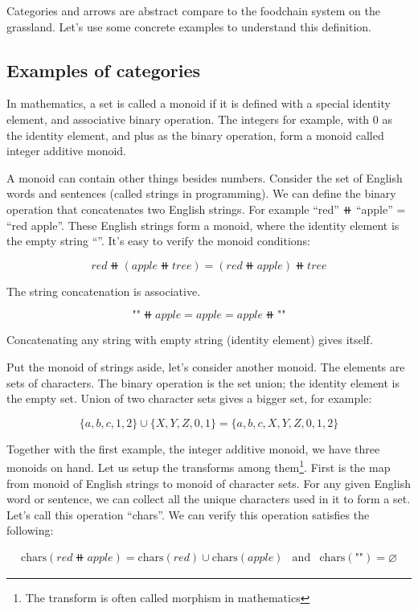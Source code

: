 \documentclass{article}
\begin{document}
Categories and arrows are abstract compare to the foodchain system on the grassland. Let's use some concrete examples to understand this definition.

\subsection{Examples of categories}

In mathematics, a set is called a monoid if it is defined with a special identity element, and associative binary operation. The integers for example, with 0 as the identity element, and plus as the binary operation, form a monoid called integer additive monoid.

A monoid can contain other things besides numbers. Consider the set of English words and sentences (called strings in programming). We can define the binary operation that concatenates two English strings. For example ``red'' $\doubleplus$ ``apple'' = ``red apple''. These English strings form a monoid, where the identity element is the empty string ``''. It's easy to verify the monoid conditions:

\[
red \doubleplus (apple \doubleplus tree) = (red \doubleplus apple) \doubleplus tree
\]

The string concatenation is associative.

\[
\texttt{""} \doubleplus apple = apple = apple \doubleplus \texttt{""}
\]

Concatenating any string with empty string (identity element) gives itself.

Put the monoid of strings aside, let's consider another monoid. The elements are sets of characters. The binary operation is the set union; the identity element is the empty set. Union of two character sets gives a bigger set, for example:

\[
\{a, b, c, 1, 2\} \cup \{X, Y, Z, 0, 1\} = \{a, b, c, X, Y, Z, 0, 1, 2\}
\]

Together with the first example, the integer additive monoid, we have three monoids on hand. Let us setup the transforms among them\footnote{The transform is often called morphism in mathematics}. First is the map from monoid of English strings to monoid of character sets. For any given English word or sentence, we can collect all the unique characters used in it to form a set. Let's call this operation ``chars''. We can verify this operation satisfies the following:

\[
\begin{array}{rcl}
\text{chars}(red \doubleplus apple) = \text{chars}(red) \cup \text{chars}(apple) & \text{and} & \text{chars}(\texttt{""}) = \varnothing
\end{array}
\]
\end{document}
